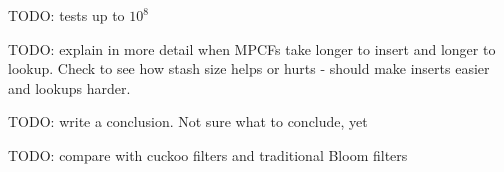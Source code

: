 \documentclass[letterpaper, 11pt]{article}
\begin{document}
TODO: tests up to $10^8$

TODO: explain in more detail when MPCFs take longer to insert and longer to lookup. Check to see how stash size helps or hurts - should make inserts easier and lookups harder.

TODO: write a conclusion. Not sure what to conclude, yet

TODO: compare with cuckoo filters and traditional Bloom filters












\end{document}
